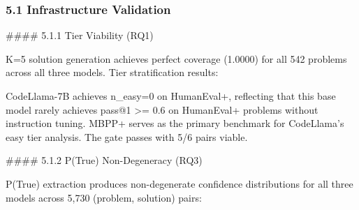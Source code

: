 
\subsubsection{5.1 Infrastructure Validation}

\#\#\#\# 5.1.1 Tier Viability (RQ1)

K=5 solution generation achieves perfect coverage (1.0000) for all 542 problems across all three models. Tier stratification results:

\begin{table}[htbp]
\centering
{}
\end{table}

CodeLlama-7B achieves n\_easy=0 on HumanEval+, reflecting that this base model rarely achieves pass@1 >= 0.6 on HumanEval+ problems without instruction tuning. MBPP+ serves as the primary benchmark for CodeLlama's easy tier analysis. The gate passes with 5/6 pairs viable.

\#\#\#\# 5.1.2 P(True) Non-Degeneracy (RQ3)

P(True) extraction produces non-degenerate confidence distributions for all three models across 5,730 (problem, solution) pairs:

\begin{table}[htbp]
\centering
{}
\end{table}

